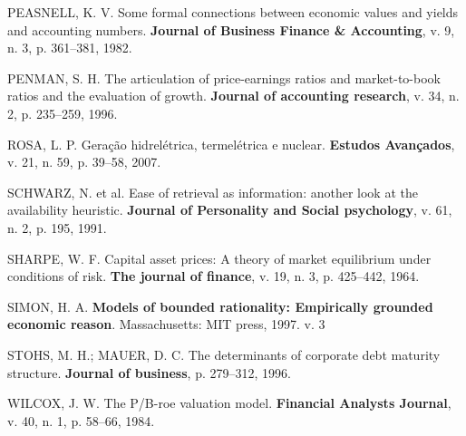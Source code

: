 \documentclass[aprovado,numbers]{coppe}
\newenvironment{cslreferences}%
  {}%
  {\par}
\begin{document}
\begin{cslreferences}
  \leavevmode\hypertarget{ref-peasnell1982}{}%
  PEASNELL, K. V. Some formal connections between economic values and yields and accounting numbers. \textbf{Journal of Business Finance \& Accounting}, v. 9, n. 3, p. 361--381, 1982.

  \leavevmode\hypertarget{ref-penman1996}{}%
  PENMAN, S. H. The articulation of price-earnings ratios and market-to-book ratios and the evaluation of growth. \textbf{Journal of accounting research}, v. 34, n. 2, p. 235--259, 1996.

  \leavevmode\hypertarget{ref-rosa2007}{}%
  ROSA, L. P. Geração hidrelétrica, termelétrica e nuclear. \textbf{Estudos Avançados}, v. 21, n. 59, p. 39--58, 2007.

  \leavevmode\hypertarget{ref-schwarz1991}{}%
  SCHWARZ, N. et al. Ease of retrieval as information: another look at the availability heuristic. \textbf{Journal of Personality and Social psychology}, v. 61, n. 2, p. 195, 1991.

  \leavevmode\hypertarget{ref-sharpe1964}{}%
  SHARPE, W. F. Capital asset prices: A theory of market equilibrium under conditions of risk. \textbf{The journal of finance}, v. 19, n. 3, p. 425--442, 1964.

  \leavevmode\hypertarget{ref-simon1997}{}%
  SIMON, H. A. \textbf{Models of bounded rationality: Empirically grounded economic reason}. Massachusetts: MIT press, 1997. v. 3

  \leavevmode\hypertarget{ref-stohs1996}{}%
  STOHS, M. H.; MAUER, D. C. The determinants of corporate debt maturity structure. \textbf{Journal of business}, p. 279--312, 1996.

  \leavevmode\hypertarget{ref-wilcox1984}{}%
  WILCOX, J. W. The P/B-roe valuation model. \textbf{Financial Analysts Journal}, v. 40, n. 1, p. 58--66, 1984.
  \end{cslreferences}
  \backmatter
  
  

\end{document}
